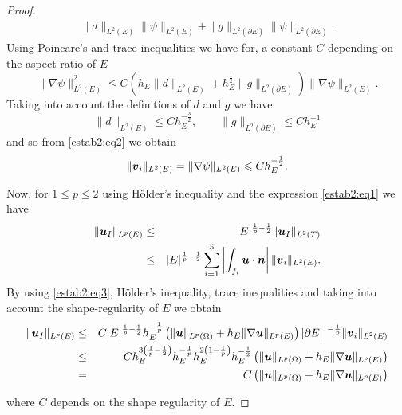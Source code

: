 \begin{proof}
\begin{eqnarray*}
\|d\|_{L^2(E)}\|\psi\|_{L^2(E)} + \|g\|_{L^2(\partial E)}\|\psi\|_{L^2(\partial E)}.
\end{eqnarray*}
Using Poincare's and trace inequalities we have for, a constant $C$ depending on the aspect ratio of $E$ 
\begin{equation}\label{estab2:eq2}
\|\nabla\psi\|_{L^2(E)}^2\leqslant  C\left(h_E\|d\|_{L^2(E)} + h_E^\frac12 \|g\|_{L^2(\partial E)}\right) \|\nabla\psi\|_{L^2(E)}.
\end{equation}
Taking into account the definitions of $d$ and $g$ we have
\[
\|d\|_{L^2(E)}\leqslant Ch_E^{-\frac32}, \qquad \|g\|_{L^2(\partial E)}\leqslant Ch_E^{-1}
\]
and so from \eqref{estab2:eq2} we obtain
\begin{equation}\label{estab2:eq3}
\|\boldsymbol{v}_i\|_{L^2(E)}=\|\nabla\psi\|_{L^2(E)}\leqslant Ch_E^{-\frac12}.
\end{equation}

Now, for $1\leqslant p\leqslant 2$ using H\"older's inequality and the expression \eqref{estab2:eq1} we have
\begin{eqnarray*}
\|\boldsymbol{u}_I\|_{L^p(E)}&\le& |E|^{\frac1p-\frac12}\|\boldsymbol{u}_I\|_{L^2(T)}\\&\le&|E|^{\frac1p-\frac12} \sum_{i=1}^5  \left|\int_{f_i}\boldsymbol{u}\cdot\boldsymbol{n}\right|\|\boldsymbol{v}_i\|_{L^2(E)}.
\end{eqnarray*}
By using \eqref{estab2:eq3}, H\"older's inequality, trace inequalities and taking into account the shape-regularity of $E$ we obtain
\begin{eqnarray*}
\|\boldsymbol{u}_I\|_{L^p(E)}&\le& C |E|^{\frac1p-\frac12} h_E^{-\frac1p}\left(\|\boldsymbol{u}\|_{L^p(\Omega)}+h_E\|\nabla\boldsymbol{u}\|_{L^p(E)}\right)|\partial E|^{1-\frac1p} \|\boldsymbol{v}_i\|_{L^2(E)}\\&\le& C h_E^{3\left(\frac1p-\frac12\right)}h_E^{-\frac1p}h_E^{2\left(1-\frac1p\right)} h_E^{-\frac12}\left(\|\boldsymbol{u}\|_{L^p(\Omega)}+h_E\|\nabla\boldsymbol{u}\|_{L^p(E)}\right)\\&=& C \left(\|\boldsymbol{u}\|_{L^p(\Omega)}+h_E\|\nabla\boldsymbol{u}\|_{L^p(E)}\right)
\end{eqnarray*}



where $C$ depends on the shape regularity of $E$.
\end{proof}

